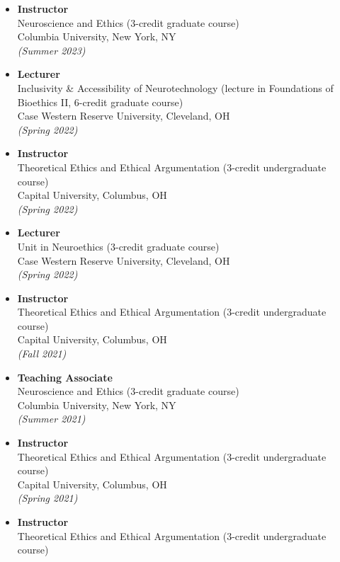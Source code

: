 \documentclass[
  letterpaper,
  DIV=11,
  numbers=noendperiod]{scrartcl}
\begin{document}
\begin{itemize}
\item
  \textbf{Instructor}\\
  Neuroscience and Ethics (3-credit graduate course)\\
  Columbia University, New York, NY\\
  \emph{(Summer 2023)}
\item
  \textbf{Lecturer}\\
  Inclusivity \& Accessibility of Neurotechnology (lecture in
  Foundations of Bioethics II, 6-credit graduate course)\\
  Case Western Reserve University, Cleveland, OH\\
  \emph{(Spring 2022)}
\item
  \textbf{Instructor}\\
  Theoretical Ethics and Ethical Argumentation (3-credit undergraduate
  course)\\
  Capital University, Columbus, OH\\
  \emph{(Spring 2022)}
\item
  \textbf{Lecturer}\\
  Unit in Neuroethics (3-credit graduate course)\\
  Case Western Reserve University, Cleveland, OH\\
  \emph{(Spring 2022)}
\item
  \textbf{Instructor}\\
  Theoretical Ethics and Ethical Argumentation (3-credit undergraduate
  course)\\
  Capital University, Columbus, OH\\
  \emph{(Fall 2021)}
\item
  \textbf{Teaching Associate}\\
  Neuroscience and Ethics (3-credit graduate course)\\
  Columbia University, New York, NY\\
  \emph{(Summer 2021)}
\item
  \textbf{Instructor}\\
  Theoretical Ethics and Ethical Argumentation (3-credit undergraduate
  course)\\
  Capital University, Columbus, OH\\
  \emph{(Spring 2021)}
\item
  \textbf{Instructor}\\
  Theoretical Ethics and Ethical Argumentation (3-credit undergraduate
  course)\\

\end{itemize}
\end{document}

